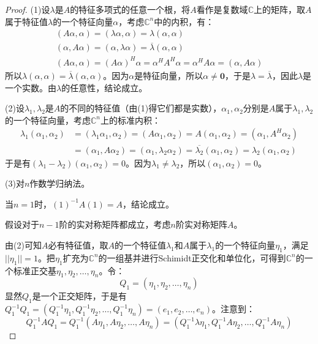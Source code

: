 \begin{proof}
	(1)设$\lambda$是$A$的特征多项式的任意一个根，将$A$看作是复数域$\mathbb{C}$上的矩阵，取$A$属于特征值$\lambda$的一个特征向量$\alpha$，考虑$\mathbb{C}^{n}$中的内积，有：
	\begin{gather*}
		(A\alpha,\alpha)=(\lambda\alpha,\alpha)=\lambda(\alpha,\alpha) \\
		(\alpha,A\alpha)=(\alpha,\lambda\alpha)=\overline{\lambda}(\alpha,\alpha) \\
		(A\alpha,\alpha)=(A\alpha)^H\alpha=\alpha^HA^H\alpha=\alpha^H A\alpha=(\alpha,A\alpha)
	\end{gather*}
	所以$\lambda(\alpha,\alpha)=\overline{\lambda}(\alpha,\alpha)$。因为$\alpha$是特征向量，所以$\alpha\ne\mathbf{0}$，于是$\lambda=\overline{\lambda}$，因此$\lambda$是一个实数。由$\lambda$的任意性，结论成立。\par
	(2)设$\lambda_1,\lambda_2$是$A$的不同的特征值（由(1)得它们都是实数），$\alpha_1,\alpha_2$分别是$A$属于$\lambda_1,\lambda_2$的一个特征向量，考虑$\mathbb{C}^{n}$上的标准内积：
	\begin{align*}
		\lambda_1(\alpha_1,\alpha_2)
		&=(\lambda_1\alpha_1,\alpha_2)=(A\alpha_1,\alpha_2)
		=A(\alpha_1,\alpha_2)=(\alpha_1,A^H\alpha_2) \\
		&=(\alpha_1,A\alpha_2)=(\alpha_1,\lambda_2\alpha_2)=\overline{\lambda_2}(\alpha_1,\alpha_2)=\lambda_2(\alpha_1,\alpha_2)
	\end{align*}
	于是有$(\lambda_1-\lambda_2)(\alpha_1,\alpha_2)=0$。因为$\lambda_1\ne\lambda_2$，所以$(\alpha_1,\alpha_2)=0$。\par
	(3)对$n$作数学归纳法。\par
	当$n=1$时，$(1)^{-1}A(1)=A$，结论成立。\par
	假设对于$n-1$阶的实对称矩阵都成立，考虑$n$阶实对称矩阵$A$。\par
	由(2)可知$A$必有特征值，取$A$的一个特征值$\lambda_1$和$A$属于$\lambda_1$的一个特征向量$\eta_1$，满足$||\eta_1||=1$。把$\eta_1$扩充为$\mathbb{C}^{n}$的一组基并进行Schimidt正交化和单位化，可得到$\mathbb{C}^{n}$的一个标准正交基$\eta_1,\eta_2,\dots,\eta_n$。令：
	\begin{equation*}
		Q_1=(\eta_1,\eta_2,\dots,\eta_n)
	\end{equation*}
	显然$Q_1$是一个正交矩阵，于是有$Q_1^{-1}Q_1=(Q_1^{-1}\eta_1,Q_1^{-1}\eta_2,\dots,Q_1^{-1}\eta_n)=(e_1,e_2,\dots,e_n)$。注意到：
	\begin{equation*}
		Q_1^{-1}AQ_1=Q_1^{-1}(A\eta_1,A\eta_2,\dots,A\eta_n)=(Q_1^{-1}\lambda\eta_1,Q_1^{-1}A\eta_2,\dots,Q_1^{-1}A\eta_n)

\end{equation*}
\end{proof}
